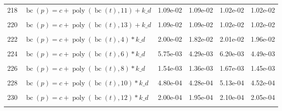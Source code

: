 \documentclass[12pt,a4paper]{article}
\DeclareMathOperator{\bc}{bc}
\DeclareMathOperator{\poly}{poly}
\begin{document}
\begin{longtable}[t]{ll>{\raggedleft\arraybackslash}p{2cm}>{\raggedleft\arraybackslash}p{2cm}>{\raggedleft\arraybackslash}p{2cm}>{\raggedleft\arraybackslash}p{2cm}}
218 & $\bc(p) = c + \poly\left( \bc(t), 11 \right) + k\_d$ & 1.09e-02 & 1.09e-02 & 1.02e-02 & 1.02e-02\\
\cellcolor{gray!6}{219} & \cellcolor{gray!6}{$\bc(p) = c + \poly\left( \bc(t), 12 \right) + k\_d$} & \cellcolor{gray!6}{1.09e-02} & \cellcolor{gray!6}{1.09e-02} & \cellcolor{gray!6}{1.02e-02} & \cellcolor{gray!6}{1.02e-02}\\
220 & $\bc(p) = c + \poly\left( \bc(t), 13 \right) + k\_d$ & 1.09e-02 & 1.09e-02 & 1.02e-02 & 1.02e-02\\
\cellcolor{gray!6}{221} & \cellcolor{gray!6}{$\bc(p) = c + \poly\left( \bc(t), 3 \right) * k\_d$} & \cellcolor{gray!6}{3.67e-02} & \cellcolor{gray!6}{1.50e-02} & \cellcolor{gray!6}{1.64e-02} & \cellcolor{gray!6}{1.58e-02}\\
222 & $\bc(p) = c + \poly\left( \bc(t), 4 \right) * k\_d$ & 2.00e-02 & 1.82e-02 & 2.01e-02 & 1.96e-02\\
\cellcolor{gray!6}{223} & \cellcolor{gray!6}{$\bc(p) = c + \poly\left( \bc(t), 5 \right) * k\_d$} & \cellcolor{gray!6}{6.14e-03} & \cellcolor{gray!6}{6.09e-03} & \cellcolor{gray!6}{6.00e-03} & \cellcolor{gray!6}{5.93e-03}\\
224 & $\bc(p) = c + \poly\left( \bc(t), 6 \right) * k\_d$ & 5.75e-03 & 4.29e-03 & 6.20e-03 & 4.49e-03\\
\cellcolor{gray!6}{225} & \cellcolor{gray!6}{$\bc(p) = c + \poly\left( \bc(t), 7 \right) * k\_d$} & \cellcolor{gray!6}{2.24e-03} & \cellcolor{gray!6}{1.83e-03} & \cellcolor{gray!6}{1.96e-03} & \cellcolor{gray!6}{1.74e-03}\\
226 & $\bc(p) = c + \poly\left( \bc(t), 8 \right) * k\_d$ & 1.54e-03 & 1.36e-03 & 1.67e-03 & 1.45e-03\\
\cellcolor{gray!6}{227} & \cellcolor{gray!6}{$\bc(p) = c + \poly\left( \bc(t), 9 \right) * k\_d$} & \cellcolor{gray!6}{7.92e-04} & \cellcolor{gray!6}{7.23e-04} & \cellcolor{gray!6}{8.39e-04} & \cellcolor{gray!6}{7.60e-04}\\
228 & $\bc(p) = c + \poly\left( \bc(t), 10 \right) * k\_d$ & 4.80e-04 & 4.28e-04 & 5.13e-04 & 4.52e-04\\
\cellcolor{gray!6}{229} & \cellcolor{gray!6}{$\bc(p) = c + \poly\left( \bc(t), 11 \right) * k\_d$} & \cellcolor{gray!6}{2.16e-04} & \cellcolor{gray!6}{2.09e-04} & \cellcolor{gray!6}{2.28e-04} & \cellcolor{gray!6}{2.19e-04}\\
230 & $\bc(p) = c + \poly\left( \bc(t), 12 \right) * k\_d$ & 2.00e-04 & 1.95e-04 & 2.10e-04 & 2.05e-04\\
\cellcolor{gray!6}{231} & \cellcolor{gray!6}{$\bc(p) = c + \poly\left( \bc(t), 13 \right) * k\_d$} & \cellcolor{gray!6}{1.76e-04} & \cellcolor{gray!6}{1.74e-04} & \cellcolor{gray!6}{1.88e-04} & \cellcolor{gray!6}{1.86e-04}\\*
\end{longtable}
\endgroup{}
\end{document}
